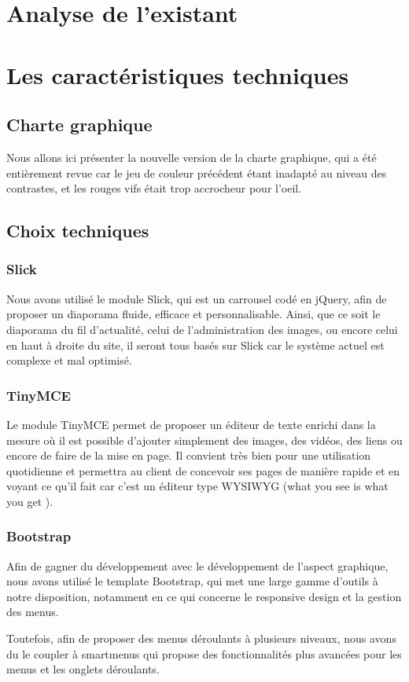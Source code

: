 \documentclass[11pt]{report}
\begin{document}
\chapter{Analyse de l'existant}

\chapter{Les caractéristiques techniques}
\section{Charte graphique}
Nous allons ici présenter la nouvelle version de la charte graphique, qui a été 
entièrement revue car le jeu de couleur précédent étant inadapté au niveau des 
contrastes, et les rouges vifs était trop accrocheur pour l'oeil.

\section{Choix techniques}
\subsection{Slick}
Nous avons utilisé le module Slick, qui est un carrousel codé en jQuery, afin
de proposer un diaporama fluide, efficace et personnalisable. Ainsi, que ce soit
le diaporama du fil d'actualité, celui de l'administration des images, ou encore
celui en haut à droite du site, il seront tous basés sur Slick car le système
actuel est complexe et mal optimisé.

\subsection{TinyMCE}
Le module TinyMCE permet de proposer un éditeur de texte enrichi dans la mesure
où il est possible d'ajouter simplement des images, des vidéos, des liens ou
encore de faire de la mise en page. Il convient très bien pour une utilisation
quotidienne et permettra au client de concevoir ses pages de manière rapide et
en voyant ce qu'il fait car c'est un éditeur type \og WYSIWYG \fg{} (\og what 
you
see is what you get \fg{}).

\subsection{Bootstrap}
Afin de gagner du développement avec le développement de l'aspect graphique,
nous avons utilisé le template Bootstrap, qui met une large gamme d'outils à
notre disposition, notamment en ce qui concerne le responsive design et la
gestion des menus. \\
\par Toutefois, afin de proposer des menus déroulants à plusieurs niveaux, nous
avons du le coupler à \og smartmenus \fg{} qui propose des fonctionnalités plus
avancées pour les menus et les onglets déroulants.
\end{document}

